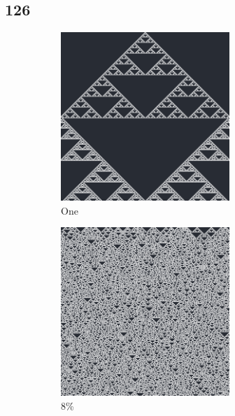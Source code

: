 \documentclass[12pt, fleqn]{report}                             %
\theoremstyle{break}                                            %
\begin{document}
      \subsection{126}
        \begin{figure}[h!]
          \centering
          \begin{subfigure}[b]{0.4\linewidth}
            \includegraphics[width=0.7\textwidth]{Images/126/a.png}
            \caption{One}
          \end{subfigure}
          \begin{subfigure}[b]{0.4\linewidth}
            \includegraphics[width=0.7\textwidth]{Images/126/b.png}
            \caption{8\%}
          \end{subfigure}
          \begin{subfigure}[b]{0.4\linewidth}

\end{subfigure}
\end{figure}
\end{document}
